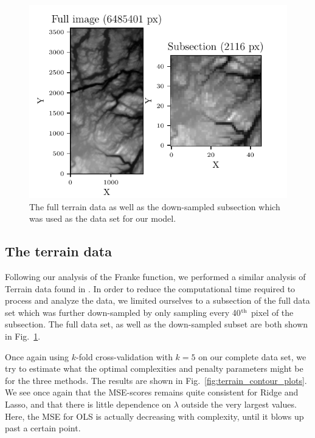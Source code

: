 \documentclass[reprint, english, nofootinbib]{revtex4-2}
\begin{document}


\begin{figure}[h!tb]
    \center
    \includegraphics[width=\columnwidth]{TerrainData.pdf}
    \caption{\label{fig:terrain image}The full terrain data as well as the down-sampled subsection which was used as the data set for our model.}
\end{figure}

\subsection{The terrain data}
\noindent
Following our analysis of the Franke function, we performed a similar analysis of Terrain data found in \cite{4155_repo}. In order to reduce the computational time required to process and analyze the data, we limited ourselves to a subsection of the full data set which was further down-sampled by only sampling every 40$^{\textup{th}}$ pixel of the subsection. The full data set, as well as the down-sampled subset are both shown in Fig.~\ref{fig:terrain image}.

Once again using $k$-fold cross-validation with $k=5$ on our complete data set, we try to estimate what the optimal complexities and penalty parameters might be for the three methods. The results are shown in Fig.~\ref{fig:terrain_contour_plots}. We see once again that the MSE-scores remains quite consistent for Ridge and Lasso, and that there is little dependence on $\lambda$ outside the very largest values. Here, the MSE for OLS is actually decreasing with complexity, until it blows up past a certain point.
\end{document}
